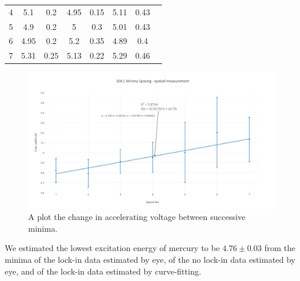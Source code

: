 \documentclass[prb,preprint]{revtex4-1}
\begin{document}
\begin{table}[h!]
\begin{ruledtabular}
\begin{tabular}{cccccccl}
4         & 5.1                                          & 0.2                                         & 4.95                                             & 0.15                                            & 5.11                                           & 0.43                                           \\
5         & 4.9                                          & 0.2                                         & 5                                                & 0.3                                             & 5.01                                           & 0.43                                           \\
6         & 4.95                                         & 0.2                                         & 5.2                                              & 0.35                                            & 4.89                                           & 0.4                                            \\
7         & 5.31                                         & 0.25                                        & 5.13                                             & 0.22                                            & 5.29                                           & 0.46                                          
\end{tabular}
\end{ruledtabular}
\label{minimaSpacing}
\end{table}

\begin{figure}[h!]
\centering
\includegraphics[width=6in]{204C_minima_eyeball.pdf}
\caption{A plot the change in accelerating voltage between successive minima.}
\label{nomineye}
\end{figure}

We estimated the lowest excitation energy of mercury to be $4.76\pm0.03$
from the minima of the lock-in data estimated by eye, of the no lock-in data estimated by eye, and of the lock-in data estimated by curve-fitting.
\end{document}
